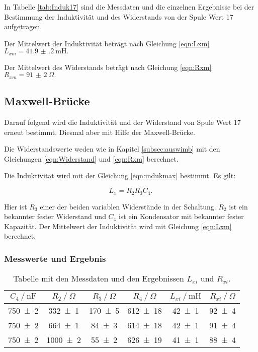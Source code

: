 In Tabelle \ref{tab:Induk17} sind die Messdaten und die einzelnen
Ergebnisse bei der Bestimmung der Induktivität und des Widerstands
von der Spule Wert 17 aufgetragen.

Der Mittelwert der Induktivität beträgt nach Gleichung \eqref{eqn:Lxm}
$L_{xm} = \SI{41.9(2)}{\milli\henry}.$

Der Mittelwert des Widerstands beträgt nach Gleichung \eqref{eqn:Rxm}
$R_{xm} = \SI{91(2)}{\Omega}.$

\subsection{Maxwell-Brücke}
\label{sec:auswmaxw}

Darauf folgend wird die Induktivität und der Widerstand von Spule Wert 17 erneut
bestimmt. Diesmal aber mit Hilfe der Maxwell-Brücke.

Die Widerstandswerte weden wie in Kapitel \ref{subsec:auswimb} mit den Gleichungen
\eqref{eqn:Widerstand} und \eqref{eqn:Rxm} berechnet.

Die Induktivität wird mit der Gleichung \eqref{eqn:indukmax} bestimmt.
Es gilt:

\begin{equation}
  L_x = R_2 R_3 C_4.
  \label{eqn:indukmax}
\end{equation}

Hier ist $R_3$ einer der beiden variablen Widerstände in der Schaltung. $R_2$
ist ein bekannter fester Widerstand und $C_4$ ist ein Kondensator mit bekannter
fester Kapazität.
Der Mittelwert der Induktivität wird mit Gleichung \eqref{eqn:Lxm} berechnet.

\subsubsection{Messwerte und Ergebnis}

\begin{table}
  \centering
  \caption{Tabelle mit den Messdaten und den Ergebnissen $L_{xi}$ und $R_{xi}$.}
  \label{tab:Indukmax17}
  \begin{tabular}{c c c c c c}
    \toprule
    $C_4 \ /\ \si{\nano\farad}$ & $R_2 \ /\ \si{\Omega}$ & $R_3 \ /\ \si{\Omega}$ &
    $R_4 \ /\ \si{\Omega}$ & $L_{xi} \ /\ \si{\milli\henry}$ & $R_{xi} \ /\ \si{\Omega}$ \\
    \midrule
    \num{750 +- 2} & \num{332 +- 1} & \num{170 +- 5} & \num{612 +- 18} & \num{42 +- 1} & \num{92 +- 4}\\
    \num{750 +- 2} & \num{664 +- 1} & \num{84 +- 3} & \num{614 +- 18} & \num{42 +- 1} & \num{91 +- 4}\\
    \num{750 +- 2} & \num{1000 +- 2} & \num{55 +- 2} & \num{626 +- 19} & \num{41 +- 1} & \num{88 +- 4}\\
    \bottomrule
  \end{tabular}
\end{table}

